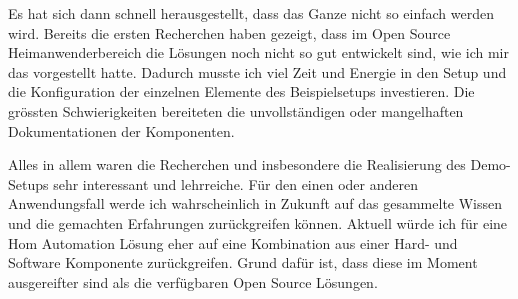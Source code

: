Es hat sich dann schnell herausgestellt, dass das Ganze nicht so einfach werden wird. Bereits die ersten Recherchen haben gezeigt, dass im Open Source Heimanwenderbereich die Lösungen noch nicht so gut entwickelt sind, wie ich mir das vorgestellt hatte. Dadurch musste ich viel Zeit und Energie in den Setup und die Konfiguration der einzelnen Elemente des Beispielsetups investieren. Die grössten Schwierigkeiten bereiteten die unvollständigen oder mangelhaften Dokumentationen der Komponenten. 

Alles in allem waren die Recherchen und insbesondere die Realisierung des Demo-Setups sehr interessant und lehrreiche. Für den einen oder anderen Anwendungsfall werde ich wahrscheinlich in Zukunft auf das gesammelte Wissen und die gemachten Erfahrungen zurückgreifen können. Aktuell würde ich für eine Hom Automation Lösung eher auf eine Kombination aus einer Hard- und Software Komponente zurückgreifen. Grund dafür ist, dass diese im Moment ausgereifter sind als die verfügbaren Open Source Lösungen.



